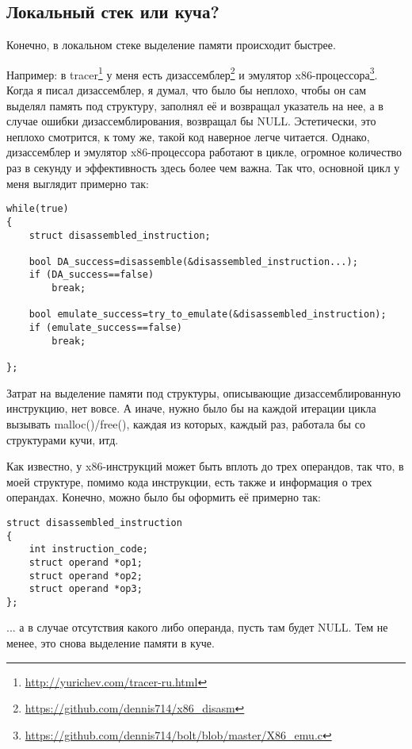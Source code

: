 ﻿\subsection{Локальный стек или куча?}

Конечно, в локальном стеке выделение памяти происходит быстрее.

Например: в tracer\footnote{\url{http://yurichev.com/tracer-ru.html}} у меня есть дизассемблер\footnote{\url{https://github.com/dennis714/x86_disasm}} 
и эмулятор x86-процессора\footnote{\url{https://github.com/dennis714/bolt/blob/master/X86_emu.c}}.
Когда я писал дизассемблер, я думал, что было бы неплохо, чтобы он сам выделял память под структуру, заполнял её
и возвращал указатель на нее, а в случае ошибки дизассемблирования, возвращал бы NULL. Эстетически, это 
неплохо смотрится, к тому же, такой код наверное легче читается. Однако, дизассемблер и эмулятор x86-процессора
работают в цикле, огромное количество раз в секунду и эффективность здесь более чем важна.
Так что, основной цикл у меня выглядит примерно так:

\begin{lstlisting}
while(true)
{
	struct disassembled_instruction;

	bool DA_success=disassemble(&disassembled_instruction...);
	if (DA_success==false)
		break;

	bool emulate_success=try_to_emulate(&disassembled_instruction);
	if (emulate_success==false)
		break;

};
\end{lstlisting}

Затрат на выделение памяти под структуры, описывающие дизассемблированную инструкцию, нет вовсе.
А иначе, нужно было бы на каждой итерации цикла вызывать malloc()/free(), каждая из которых, каждый раз,
работала бы со структурами кучи, итд.

Как известно, у x86-инструкций может быть вплоть до трех операндов, так что, в моей структуре, помимо
кода инструкции, есть также и информация о трех операндах. Конечно, можно было бы оформить её примерно так:

\begin{lstlisting}
struct disassembled_instruction
{
	int instruction_code;
	struct operand *op1;
	struct operand *op2;
	struct operand *op3;
};
\end{lstlisting}

... а в случае отсутствия какого либо операнда, пусть там будет NULL. Тем не менее, это снова выделение памяти в куче.

